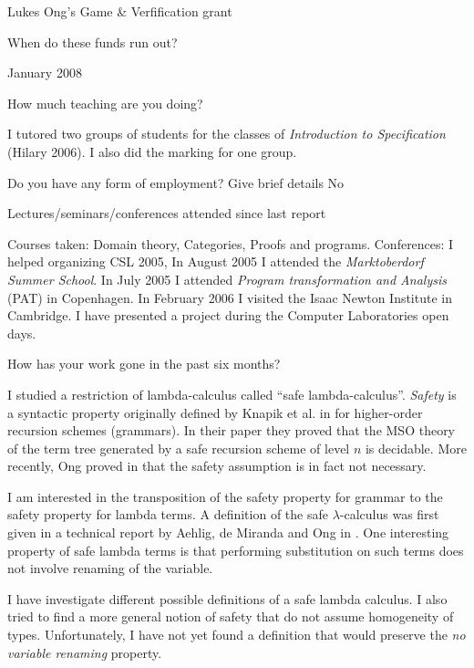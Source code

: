 \documentclass{article}
\def\answ#1{#1 \vspace{0.5em}}
\newcounter{SQcount}
\newenvironment{subq}{
\begin{list}
    {} %
    {   \usecounter{SQcount}
        \renewcommand{\makelabel}[1]{\stepcounter{SQcount} \textbf{\alph{SQcount}) \parbox[t]{0.8\linewidth}{{##1}}}  }
        \setlength{\rightmargin}{\leftmargin}
    }
}
{\end{list}}
\begin{document}
\begin{list}
\begin{subq}
    \answ{Lukes Ong's Game \& Verfification grant }

\item[When do these funds run out?] \

   \answ{January 2008}

\end{subq}

\item[How much teaching are you doing?] \

\answ{I tutored two groups of students for the classes of
\emph{Introduction to Specification }(Hilary 2006). I also did the
marking for one group.}

\item[Do you have any form of employment? Give brief details]
\answ{No}

\item[Lectures/seminars/conferences attended since last report] \

\answ{Courses taken: Domain theory, Categories, Proofs and programs. Conferences: I helped organizing CSL 2005,
In August 2005 I attended the \emph{Marktoberdorf Summer School}. In July 2005 I attended \emph{Program transformation and Analysis} (PAT) in Copenhagen.
In February 2006 I visited the Isaac Newton Institute in Cambridge. I have presented a project during the Computer Laboratories open days.
}

\item[How has your work gone in the past six months?] \

\answ{ I studied a restriction of lambda-calculus called ``safe
lambda-calculus''. \emph{Safety} is a syntactic property originally
defined by Knapik et al. in \cite{KNU02} for higher-order recursion
schemes (grammars). In their paper they proved that the MSO theory
of the term tree generated by a safe recursion scheme of level $n$
is decidable. More recently, Ong proved in \cite{OngLics2006} that
the safety assumption is in fact not necessary.}

I am interested in the transposition of the safety property for
grammar to the safety property for lambda terms. A definition of the
safe $\lambda$-calculus was first given in a technical report by
Aehlig, de Miranda and Ong in \cite{safety-mirlong2004}. One
interesting property of safe lambda terms is that performing
substitution on such terms does not involve renaming of the
variable.

I have investigate different possible definitions of a safe lambda
calculus. I also tried to find a more general notion of safety that
do not assume homogeneity of types. Unfortunately, I have not yet
found a definition that would preserve the \emph{no variable
renaming} property.


\end{list}
\end{document}
